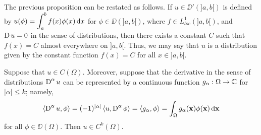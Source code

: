 The previous proposition can be restated as follows.  If
$u \in \DD'(]a,b[)$ is defined by
$\displaystyle u(\phi) = \int_a^b f(x) \phi(x) \,\mathrm{d}{x}$ for
$\phi \in \DD(]a,b[)$, where $\displaystyle f \in L_{loc}^1(]a,b[)$, and
$\operatorname{D} u = 0$ in the sense of distributions, then there exists a constant
$C$ such that $f(x) = C$ almost everywhere on $]a,b[$.  Thus, we may
say that $u$ is a distribution given by the constant function
$f(x) = C$ for all $x \in ]a,b[$.

\begin{prop} \label{distr_cdistr_cder}
Suppose that $u \in C(\Omega)$.  Moreover, suppose that the derivative
in the sense of distributions $\displaystyle \operatorname{D}^\alpha u$ can be
represented by a continuous function $g_\alpha:\Omega \to \mathbb{C}$ for
$|\alpha|\leq k$; namely,
\[
\left\langle{\operatorname{D}^{\alpha} u} , {\phi}\right\rangle = (-1)^{|\alpha|} \left\langle{u} , {\operatorname{D}^\alpha\phi}\right\rangle
= \left\langle{g_\alpha} , {\phi}\right\rangle = \int_{\Omega} g_{\alpha}(\mathbf{x})
\phi(\mathbf{x}) \,\mathrm{d}{\mathbf{x}}
\]
for all $\phi \in \DD(\Omega)$.  Then
$\displaystyle u \in C^k(\Omega)$.
\end{prop}

